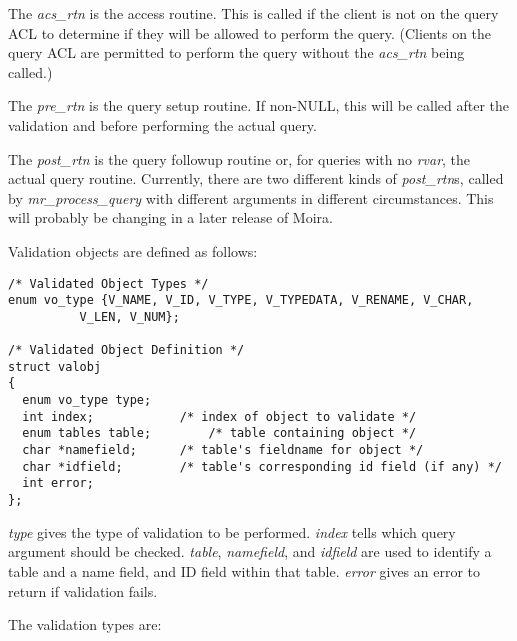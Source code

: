 The {\it acs\_rtn\/} is the access routine. This is called if the
client is not on the query ACL to determine if they will be allowed to
perform the query. (Clients on the query ACL are permitted to perform
the query without the {\it acs\_rtn\/} being called.)

The {\it pre\_rtn\/} is the query setup routine. If non-NULL, this
will be called after the validation and before performing the actual
query.

The {\it post\_rtn\/} is the query followup routine or, for queries
with no {\it rvar\/}, the actual query routine. Currently, there are
two different kinds of {\it post\_rtn\/}s, called by {\it
mr\_process\_query} with different arguments in different
circumstances. This will probably be changing in a later release of
Moira.

\noindent Validation objects are defined as follows:

\begin{verbatim}
/* Validated Object Types */
enum vo_type {V_NAME, V_ID, V_TYPE, V_TYPEDATA, V_RENAME, V_CHAR,
	      V_LEN, V_NUM};

/* Validated Object Definition */
struct valobj
{
  enum vo_type type;
  int index;			/* index of object to validate */
  enum tables table;     	/* table containing object */
  char *namefield;		/* table's fieldname for object */
  char *idfield;		/* table's corresponding id field (if any) */
  int error;
};
\end{verbatim}

{\it type\/} gives the type of validation to be performed. {\it
index\/} tells which query argument should be checked. {\it table},
{\it namefield}, and {\it idfield\/} are used to identify a table and
a name field, and ID field within that table. {\it error\/} gives an
error to return if validation fails.

The validation types are:

